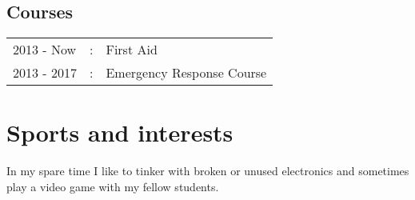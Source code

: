\documentclass[11pt]{article}
\begin{document}
	\subsection*{Courses}
		\begin{tabular}{l c l}
			2013 - Now	&:& First Aid \\
			2013 - 2017 &:& Emergency Response Course\\
			
		\end{tabular}
	
	\section*{Sports and interests}
	In my spare time I like to tinker with broken or unused electronics and sometimes play a video game with my fellow students.
	
	
	
	
\end{document}
